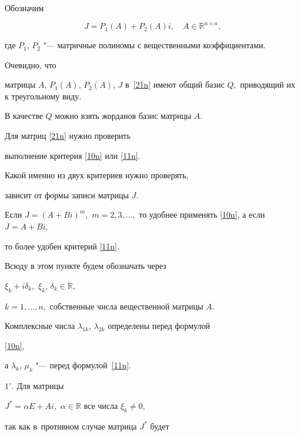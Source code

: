 \smallskip




Обозначим

\begin{equation}

J=P_1(A)+P_2(A)i,\quad A\in\mathbb{R}^{n\times n},

\label{21n}

\end{equation}

где $P_1$, $P_2$ "---  матричные полиномы с вещественными коэффициентами.

 Очевидно, что

 матрицы $A$, $P_1(A)$, $P_2(A)$, $J$  в~\eqref{21n} имеют общий базис $Q,$ приводящий их к  треугольному виду.

В качестве $Q$ можно взять жорданов базис матрицы $A.$



Для   матриц  \eqref{21n}  нужно проверить

выполнение  критерия \eqref{10n} или  \eqref{11n}.

Какой именно из двух критериев нужно проверять, 

зависит от формы записи матрицы $J.$ 

Если $J=(A+Bi)^m,$ $m=2, 3, \ldots,$ то удобнее применять \eqref{10n}, а если $J=A+Bi,$

то более удобен  критерий \eqref{11n}.



Всюду в этом пункте будем обозначать через

 $\xi_k+i\delta_k,$ $\xi_k$, $\delta_k\in\mathbb{R},$

 \mbox{$k=1, \ldots, n,$} собственные числа вещественной  матрицы    $A.$

 Комплексные числа $\lambda_{1k}$, $\lambda_{2k}$ определены перед формулой

 \eqref{10n},

а $\lambda_k$, $\mu_k$ "--- перед формулой~\eqref{11n}.



\smallskip



$1^\circ.$ Для матрицы

 $J^*=\alpha E+Ai,$ $\alpha\in\mathbb{R}$ все числа  $\xi_k\ne 0,$

так как в~противном случае матрица $J^*$ будет


